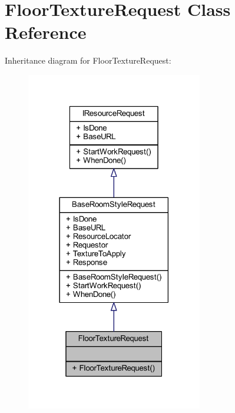 \hypertarget{class_floor_texture_request}{}\section{Floor\+Texture\+Request Class Reference}
\label{class_floor_texture_request}


Inheritance diagram for Floor\+Texture\+Request\+:
\nopagebreak
\begin{figure}[H]
\begin{center}
\leavevmode
\includegraphics[width=218pt]{class_floor_texture_request__inherit__graph}
\end{center}
\end{figure}


